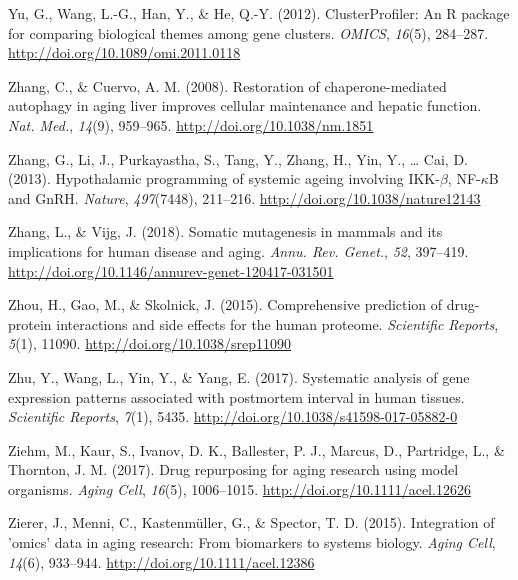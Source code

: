 \documentclass[12pt,twoside]{unicam}
\begin{document}
\begin{cslreferences}
\leavevmode\hypertarget{ref-Yu2012}{}%
Yu, G., Wang, L.-G., Han, Y., \& He, Q.-Y. (2012). ClusterProfiler: An R package for comparing biological themes among gene clusters. \emph{OMICS}, \emph{16}(5), 284--287. \url{http://doi.org/10.1089/omi.2011.0118}

\leavevmode\hypertarget{ref-Zhang2008}{}%
Zhang, C., \& Cuervo, A. M. (2008). Restoration of chaperone-mediated autophagy in aging liver improves cellular maintenance and hepatic function. \emph{Nat. Med.}, \emph{14}(9), 959--965. \url{http://doi.org/10.1038/nm.1851}

\leavevmode\hypertarget{ref-Zhang2013}{}%
Zhang, G., Li, J., Purkayastha, S., Tang, Y., Zhang, H., Yin, Y., \ldots{} Cai, D. (2013). Hypothalamic programming of systemic ageing involving IKK-\(\beta\), NF-\(\kappa\)B and GnRH. \emph{Nature}, \emph{497}(7448), 211--216. \url{http://doi.org/10.1038/nature12143}

\leavevmode\hypertarget{ref-Zhang2018}{}%
Zhang, L., \& Vijg, J. (2018). Somatic mutagenesis in mammals and its implications for human disease and aging. \emph{Annu. Rev. Genet.}, \emph{52}, 397--419. \url{http://doi.org/10.1146/annurev-genet-120417-031501}

\leavevmode\hypertarget{ref-Zhou2015}{}%
Zhou, H., Gao, M., \& Skolnick, J. (2015). Comprehensive prediction of drug-protein interactions and side effects for the human proteome. \emph{Scientific Reports}, \emph{5}(1), 11090. \url{http://doi.org/10.1038/srep11090}

\leavevmode\hypertarget{ref-Zhu2017}{}%
Zhu, Y., Wang, L., Yin, Y., \& Yang, E. (2017). Systematic analysis of gene expression patterns associated with postmortem interval in human tissues. \emph{Scientific Reports}, \emph{7}(1), 5435. \url{http://doi.org/10.1038/s41598-017-05882-0}

\leavevmode\hypertarget{ref-Ziehm2017}{}%
Ziehm, M., Kaur, S., Ivanov, D. K., Ballester, P. J., Marcus, D., Partridge, L., \& Thornton, J. M. (2017). Drug repurposing for aging research using model organisms. \emph{Aging Cell}, \emph{16}(5), 1006--1015. \url{http://doi.org/10.1111/acel.12626}

\leavevmode\hypertarget{ref-Zierer2015}{}%
Zierer, J., Menni, C., Kastenmüller, G., \& Spector, T. D. (2015). Integration of 'omics' data in aging research: From biomarkers to systems biology. \emph{Aging Cell}, \emph{14}(6), 933--944. \url{http://doi.org/10.1111/acel.12386}
\end{cslreferences}
\end{document}
